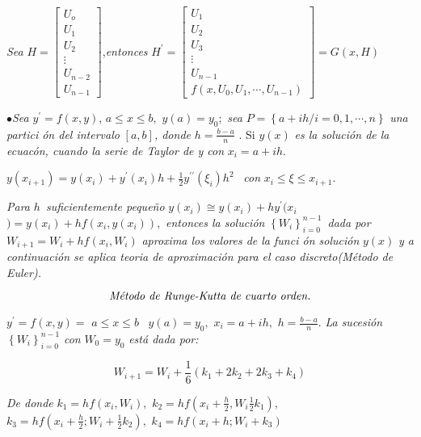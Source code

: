 \documentclass{article}
\begin{document}
\textit{Sea }$H=\left[ 
\begin{array}{c}
U_{o} \\ 
U_{1} \\ 
U_{2} \\ 
\vdots  \\ 
U_{n-2} \\ 
U_{n-1}%
\end{array}%
\right] $,\textit{entonces }$H^{\prime }=\left[ 
\begin{array}{c}
U_{1} \\ 
U_{2} \\ 
U_{3} \\ 
\vdots  \\ 
U_{n-1} \\ 
f(x,U_{0},U_{1},\cdots ,U_{n-1})%
\end{array}%
\right] =G(x,H)$

$\bullet $\textit{Sea }$y^{\prime }=f(x,y)$, $a\leq x\leq b,$ $y(a)=y_{0};$ 
\textit{sea }$P=\left\{ a+ih/i=0,1,\cdots ,n\right\} $ \textit{una partici%
\'{o}n del intervalo }$\left[ a,b\right] $\textit{, donde }$h=\frac{b-a}{n}$%
. Si $y(x)$ \textit{es la soluci\'{o}n de la ecuac\'{o}n, cuando la serie de
Taylor de y con }$x_{i}=a+ih$.

$y(x_{i+1})=y(x_{i})+y^{\prime }(x_{i})h+\frac{1}{2}y^{\prime \prime }(\xi
_{i})h^{2}$ \ \textit{con }$x_{i}\leq \xi \leq x_{i+1}.$

\textit{Para }$h$\textit{\ suficientemente peque\~{n}o }$y(x_{i})\cong
y(x_{i})+hy^{\prime }(x_{i}$ $)=y(x_{i})+hf(x_{i},y(x_{i})),$ \textit{%
entonces la soluci\'{o}n }$\left\{ W_{i}\right\} _{i=0}^{n-1}$\textit{\ dada
por }$W_{i+1}=W_{i}+hf(x_{i},W_{i})$ \textit{aproxima los valores de la funci%
\'{o}n soluci\'{o}n }$y(x)$ \textit{y a continuaci\'{o}n se aplica teoria de
aproximaci\'{o}n para el caso discreto(M\'{e}todo de Euler).}

\bigskip 

\[
\text{\emph{M\'{e}todo de Runge-Kutta de cuarto orden.}}
\]

$y^{\prime }=f(x,y)=\allowbreak $ $a\leq x\leq b$ \ $y(a)=y_{0},$ $%
x_{i}=a+ih,$ $h=\frac{b-a}{n}$. \textit{La sucesi\'{o}n }$\left\{
W_{i}\right\} _{i=0}^{n-1}$ \textit{con }$W_{0}=y_{0}$ \textit{est\'{a} dada
por:}

\[
W_{i+1}=W_{i}+\frac{1}{6}(k_{1}+2k_{2}+2k_{3}+k_{4})
\]

\textit{De donde }$k_{1}=hf(x_{i},W_{i}),$ $k_{2}=hf(x_{i}+\frac{h}{2},W_{i}%
\frac{1}{2}k_{1}),$ $k_{3}=hf(x_{i}+\frac{h}{2};W_{i}+\frac{1}{2}k_{2}),$ $%
k_{4}=hf(x_{i}+h;W_{i}+k_{3})$
\end{document}
